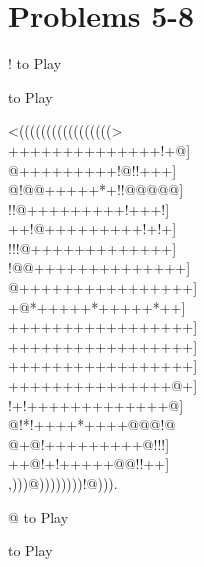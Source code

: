 \documentclass[mcrownvopaper,10pt,onecolumn,final]{memoir}
\begin{document}
\begin{figure}
\end{figure}
\section{Problems 5-8}
\begin{minipage}[c]{0.5\linewidth}
    \hspace{8.3mm} {\gnos%
        !
    }
    to Play
\end{minipage}
\begin{minipage}[c]{0.5\linewidth}
    \hspace{27mm}{\gnos%
        @
    }
    to Play
\end{minipage}
\begin{minipage}[c]{\linewidth}
    \centering
    {\gnos%
    <(((((((((((((((((>\\
    ++++++++++++++!+@]\\
    @+++++++++!@!!+++]\\
    @!@@+++++*+!!@@@@@]\\
    !!@+++++++++!+++!]\\
    ++!@+++++++++!+!+]\\
    !!!@+++++++++++++]\\
    !@@++++++++++++++]\\
    @++++++++++++++++]\\
    +@*+++++*+++++*++]\\
    +++++++++++++++++]\\
    +++++++++++++++++]\\
    +++++++++++++++++]\\
    +++++++++++++++@+]\\
    !+!+++++++++++++@]\\
    @!*!++++*++++@@@!@\\
    @+@!+++++++++@!!!]\\
    ++@!+!+++++@@!!++]\\
    ,)))@))))))))!@))).\\
    }
\end{minipage}
\begin{minipage}[c]{0.5\linewidth}
    \hspace{8.3mm} {\gnos%
        @
    }
    to Play
\end{minipage}
\begin{minipage}[c]{0.5\linewidth}
    \hspace{27mm}{\gnos%
        !
    }
    to Play
\end{minipage}
\newpage
\end{document}
